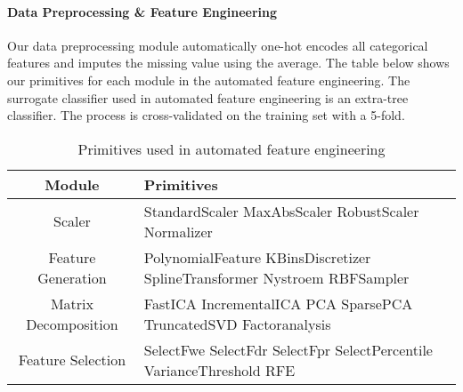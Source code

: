 \documentclass[review]{elsarticle}
\begin{document}
\paragraph{Data Preprocessing \& Feature Engineering }
Our data preprocessing module automatically one-hot encodes all categorical features and imputes the missing value using the average. The table below shows our primitives for each module in the automated feature engineering. The surrogate classifier used in automated feature engineering is an extra-tree classifier. The process is cross-validated on the training set with a 5-fold.
\begin{table}[htbp]
	\centering
	\caption{Primitives used in automated feature engineering}	
	\renewcommand\tabularxcolumn[1]{m{#1}}
	\begin{tabularx}{350pt}{|c|C|}
		\hline
		Module & Primitives \\
		\hline
		Scaler & StandardScaler MaxAbsScaler RobustScaler Normalizer \\
		\hline
		Feature Generation & PolynomialFeature KBinsDiscretizer SplineTransformer Nystroem RBFSampler \\
		\hline
		Matrix Decomposition & FastICA IncrementalICA PCA SparsePCA TruncatedSVD Factoranalysis \\
		\hline
		Feature Selection & SelectFwe SelectFdr SelectFpr SelectPercentile VarianceThreshold RFE \\
		\hline
	\end{tabularx}
\end{table}
\end{document}
